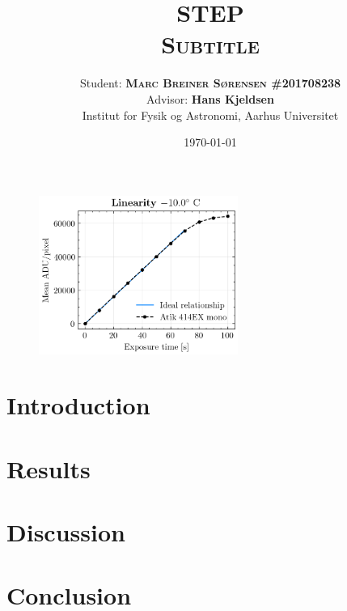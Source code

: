 \documentclass[12pt, a4paper, twoside, article]{memoir}
\title{\textsc{\textbf{STEP} \\ \normalsize Subtitle}}
\author{\normalsize Student: \textbf{\textsc{Marc Breiner Sørensen
			\#\small\textsf{201708238}}}\\
	\normalsize Advisor: \textbf{Hans Kjeldsen}\\
	\normalsize Institut for Fysik og Astronomi, Aarhus Universitet}
\date{\textsc{\textsf{\today}}}
\begin{document}
	\maketitle
	\begin{figure}[h!]
		\centering
		\includegraphics[width=0.58\textwidth]{linearity.png}
	\end{figure}
	\thispagestyle{empty}
	
	
	\newpage
	\tableofcontents
	
	\newpage
	
	
	
	\newpage
	
	\chapter{Introduction}
	\newpage
	
	
	\newpage
	
	
	\newpage
	
	\chapter{Results}
	\newpage
	
	\chapter{Discussion}
	\newpage
	
	\chapter{Conclusion}
	
	
	\newpage
	
\end{document}
